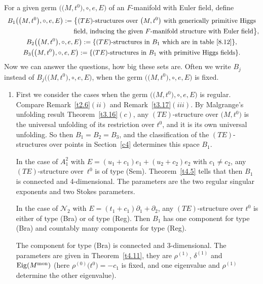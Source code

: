 \documentclass[pdftex]{sigma}%
\numberwithin{equation}{section}
\numberwithin{figure}{section}
\newcommand{\NN}{{\mathcal N}}
\newcommand{\paa}{\partial}
\DeclareMathOperator{\Eig}{Eig}
\begin{document}
\begin{Remarks}%
For a given germ $\big(\big(M,t^0\big),\circ,e,E\big)$ of an $F$-manifold
with Euler field, define
\begin{gather*}
B_1\big(\big(M,t^0\big),\circ,e,E\big):=
\big\{(TE)\text{-structures over }\big(M,t^0\big)
\text{ with generically primitive Higgs}
\\ \hphantom{B_1(\big(M,t^0\big),\circ,e,E):=\big\{}
\text{field, inducing the given $F$-manifold structure with Euler field}\big\},
\\
B_2\big(\big(M,t^0\big),\circ,e,E\big):=\{(TE)\text{-structures in }B_1
\text{ which are in table~\eqref{8.12}}\},
\\
B_3\big(\big(M,t^0\big),\circ,e,E\big):=
\{(TE)\text{-structures in }B_1\text{ with primitive Higgs fields}\}.
\end{gather*}
Now we can answer the questions, how big these sets are.
Often we write $B_j$ instead of $B_j\big(\big(M,t^0\big),\circ,e,E\big)$,
when the germ $\big(\big(M,t^0\big),\circ,e,E\big)$ is fixed.

\begin{enumerate}\itemsep=0pt
\item[$(i)$] First we consider the cases when
the germ $\big(\big(M,t^0\big),\circ, e,E\big)$ is regular.
Compare Remark~\ref{t2.6}$(ii)$ and Remark~\ref{t3.17}$(iii)$.
By Malgrange's unfolding result Theorem~\ref{t3.16}$(c)$,
any $(TE)$-structure over $\big(M,t^0\big)$ is the universal
unfolding of its restriction over $t^0$,
and it is its own universal unfolding.
So then $B_1=B_2=B_3$, and the classification of
the $(TE)$-structures over points in Section~\ref{c4}
determines this space $B_1$.

In the case of $A_1^2$ with $E=(u_1+c_1)e_1+(u_2+c_2)e_2$
with $c_1\neq c_2$, any $(TE)$-structure over~$t^0$
is of type (Sem). Theorem~\ref{t4.5}
tells that then $B_1$ is connected and 4-dimensional.
The parameters are the two regular singular exponents
and two Stokes parameters.

In the case of $\NN_2$ with $E=(t_1+c_1)\paa_1+\paa_2$,
any $(TE)$-structure over $t^0$ is either of type (Bra)
or of type (Reg). Then $B_1$ has one component
for type (Bra) and countably many components for type (Reg).

The component for type (Bra) is connected and 3-dimensional.
The parameters are given in Theorem~\ref{t4.11},
they are $\rho^{(1)}$, $\delta^{(1)}$ and
$\Eig(M^{\rm mon})$ \big(here $\rho^{(0)}\big(t^0\big)=-c_1$ is fixed, and
one eigenvalue and $\rho^{(1)}$ determine the other eigenvalue\big).


\end{enumerate}
\end{Remarks}
\end{document}

